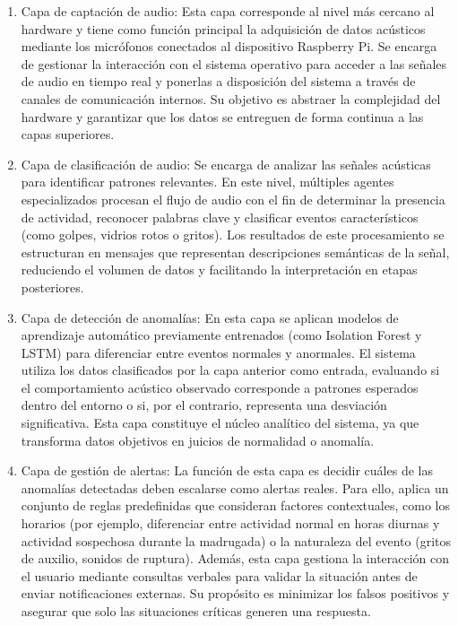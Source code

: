 \begin{enumerate}
      \item Capa de captación de audio: Esta capa corresponde al nivel más cercano al hardware y tiene como función principal la adquisición de datos acústicos mediante los micrófonos conectados al dispositivo Raspberry Pi. Se encarga de gestionar la interacción con el sistema operativo para acceder a las señales de audio en tiempo real y ponerlas a disposición del sistema a través de canales de comunicación internos. Su objetivo es abstraer la complejidad del hardware y garantizar que los datos se entreguen de forma continua a las capas superiores.
      \item Capa de clasificación de audio: Se encarga de analizar las señales acústicas para identificar patrones relevantes. En este nivel, múltiples agentes especializados procesan el flujo de audio con el fin de determinar la presencia de actividad, reconocer palabras clave y clasificar eventos característicos (como golpes, vidrios rotos o gritos). Los resultados de este procesamiento se estructuran en mensajes que representan descripciones semánticas de la señal, reduciendo el volumen de datos y facilitando la interpretación en etapas posteriores.
      \item Capa de detección de anomalías: En esta capa se aplican modelos de aprendizaje automático previamente entrenados (como Isolation Forest y LSTM) para diferenciar entre eventos normales y anormales. El sistema utiliza los datos clasificados por la capa anterior como entrada, evaluando si el comportamiento acústico observado corresponde a patrones esperados dentro del entorno o si, por el contrario, representa una desviación significativa. Esta capa constituye el núcleo analítico del sistema, ya que transforma datos objetivos en juicios de normalidad o anomalía.
      \item Capa de gestión de alertas: La función de esta capa es decidir cuáles de las anomalías detectadas deben escalarse como alertas reales. Para ello, aplica un conjunto de reglas predefinidas que consideran factores contextuales, como los horarios (por ejemplo, diferenciar entre actividad normal en horas diurnas y actividad sospechosa durante la madrugada) o la naturaleza del evento (gritos de auxilio, sonidos de ruptura). Además, esta capa gestiona la interacción con el usuario mediante consultas verbales para validar la situación antes de enviar notificaciones externas. Su propósito es minimizar los falsos positivos y asegurar que solo las situaciones críticas generen una respuesta.

\end{enumerate}

